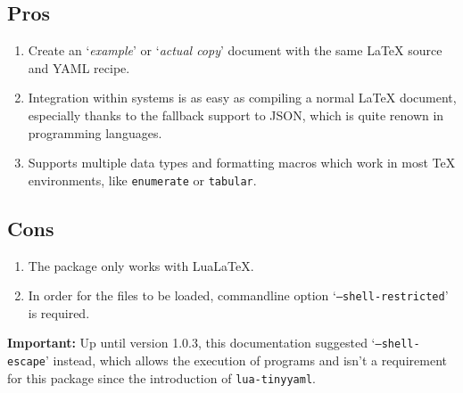 \documentclass{ltxdoc}
\begin{document}
    \begin{multicols}{2}
        \subsection{Pros}
        \begin{enumerate}[align=left]
            \item Create an `\textit{example}' or `\textit{actual copy}' document with the same \LaTeX{} source and YAML recipe.
            \item Integration within systems is as easy as compiling a normal \LaTeX{} document, especially thanks to the fallback support to JSON, which is quite renown in programming languages.
            \item Supports multiple data types and formatting macros which work in most \TeX{} environments, like \texttt{enumerate} or \texttt{tabular}.
        \end{enumerate}
        \columnbreak
        \subsection{Cons}
        \begin{enumerate}[align=left]
            \item The package only works with Lua\LaTeX{}.
            \item In order for the files to be loaded, commandline option `\texttt{--shell-restricted}' is required.
        \end{enumerate}
        \textbf{Important:} Up until version 1.0.3, this documentation suggested `\texttt{--shell-escape}' instead, which allows the execution of programs and isn't a requirement for this package since the introduction of \texttt{lua-tinyyaml}.
    \end{multicols}
\end{document}
